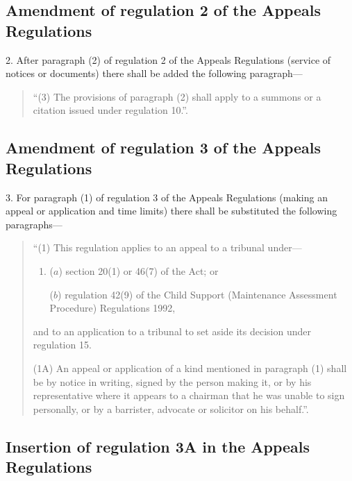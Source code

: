\documentclass[12pt,a4paper]{article}
\begin{document}
\subsection[2. Amendment of regulation 2 of the Appeals Regulations]{Amendment of regulation 2 of the Appeals Regulations}

2.  After paragraph (2) of regulation 2 of the Appeals Regulations (service of notices or documents) there shall be added the following paragraph—
\begin{quotation}
“(3) The provisions of paragraph (2) shall apply to a summons or a citation issued under regulation 10.”.
\end{quotation}

\subsection[3. Amendment of regulation 3 of the Appeals Regulations]{Amendment of regulation 3 of the Appeals Regulations}

3.  For paragraph (1) of regulation 3 of the Appeals Regulations (making an appeal or application and time limits) there shall be substituted the following paragraphs—
\begin{quotation}
“(1) This regulation applies to an appeal to a tribunal under—
\begin{enumerate}\item[]
($a$) section 20(1) or 46(7) of the Act; or

($b$) regulation 42(9) of the Child Support (Maintenance Assessment Procedure) Regulations 1992,
\end{enumerate}
and to an application to a tribunal to set aside its decision under regulation 15.

(1A) An appeal or application of a kind mentioned in paragraph (1) shall be by notice in writing, signed by the person making it, or by his representative where it appears to a chairman that he was unable to sign personally, or by a barrister, advocate or solicitor on his behalf.”.
\end{quotation}

\subsection[4. Insertion of regulation 3A in the Appeals Regulations]{Insertion of regulation 3A in the Appeals Regulations}
\end{document}
